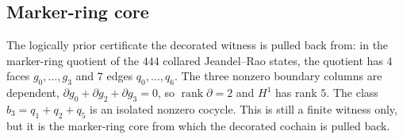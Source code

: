 \subsection{Marker-ring core}

\begin{theorem}\label{thm:jeandel-rao-b3}\leanok{}
The logically prior certificate the decorated witness is pulled back from: in
the marker-ring quotient of the $444$ collared Jeandel--Rao states, the quotient
has $4$ faces $g_0,\ldots,g_3$ and $7$ edges $q_0,\ldots,q_6$. The three
nonzero boundary columns are dependent,
$\partial g_0+\partial g_2+\partial g_3=0$, so
$\operatorname{rank}\partial=2$ and $H^1$ has rank $5$. The class
$b_3=q_1+q_2+q_5$ is an isolated nonzero cocycle. This is still a finite
witness only, but it is the marker-ring core from which the decorated cochain
is pulled back.
\end{theorem}
